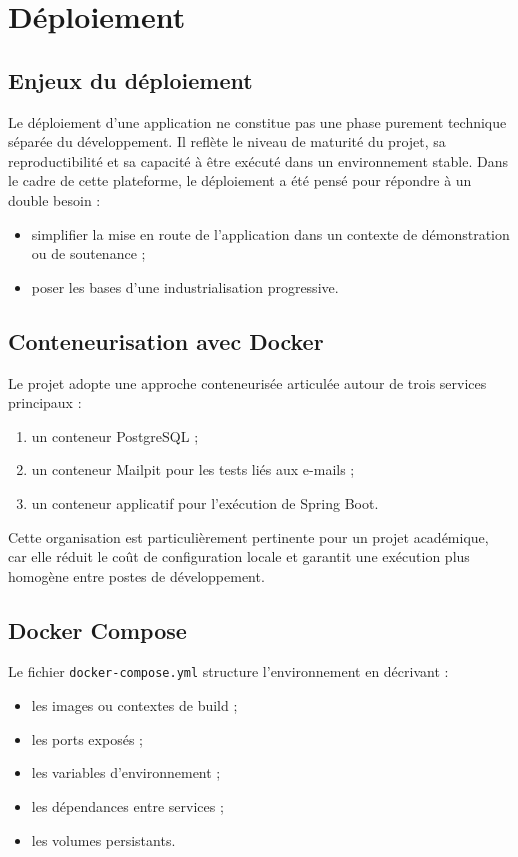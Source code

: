 ﻿\chapter{Déploiement}
\label{chap:deployment}

\section{Enjeux du déploiement}
Le déploiement d'une application ne constitue pas une phase purement technique séparée du développement. Il reflète le niveau de maturité du projet, sa reproductibilité et sa capacité à être exécuté dans un environnement stable. Dans le cadre de cette plateforme, le déploiement a été pensé pour répondre à un double besoin :
\begin{itemize}
  \item simplifier la mise en route de l'application dans un contexte de démonstration ou de soutenance ;
  \item poser les bases d'une industrialisation progressive.
\end{itemize}

\section{Conteneurisation avec Docker}
Le projet adopte une approche conteneurisée articulée autour de trois services principaux :
\begin{enumerate}
  \item un conteneur PostgreSQL ;
  \item un conteneur Mailpit pour les tests liés aux e-mails ;
  \item un conteneur applicatif pour l'exécution de Spring Boot.
\end{enumerate}

Cette organisation est particulièrement pertinente pour un projet académique, car elle réduit le coût de configuration locale et garantit une exécution plus homogène entre postes de développement.

\begin{codeblock}[H]
\caption{Fichier \texttt{docker-compose.yml} du projet}

\end{codeblock}

\section{Docker Compose}
Le fichier \texttt{docker-compose.yml} structure l'environnement en décrivant :
\begin{itemize}
  \item les images ou contextes de build ;
  \item les ports exposés ;
  \item les variables d'environnement ;
  \item les dépendances entre services ;
  \item les volumes persistants.
\end{itemize}

